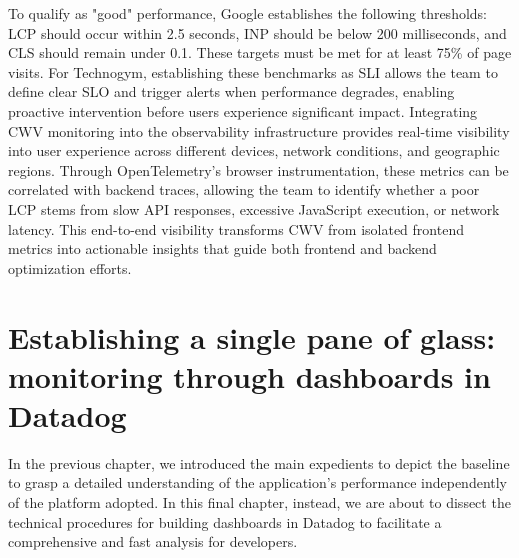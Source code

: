 \documentclass[12pt,a4paper,openright,twoside]{book}
\begin{document}
To qualify as "good" performance, Google establishes the following thresholds: LCP should occur within 2.5 seconds, INP should be below 200 milliseconds, and CLS should remain under 0.1. These targets must be met for at least 75\% of page visits. For Technogym, establishing these benchmarks as \ac{SLI} allows the team to define clear \ac{SLO} and trigger alerts when performance degrades, enabling proactive intervention before users experience significant impact. Integrating CWV monitoring into the observability infrastructure provides real-time visibility into user experience across different devices, network conditions, and geographic regions. Through OpenTelemetry's browser instrumentation, these metrics can be correlated with backend traces, allowing the team to identify whether a poor LCP stems from slow API responses, excessive JavaScript execution, or network latency. This end-to-end visibility transforms CWV from isolated frontend metrics into actionable insights that guide both frontend and backend optimization efforts.

\chapter{Establishing a single pane of glass: monitoring through dashboards in Datadog}

In the previous chapter, we introduced the main expedients to depict the baseline to grasp a detailed understanding of the application's performance independently of the platform adopted. In this final chapter, instead, we are about to dissect the technical procedures for building dashboards in Datadog to facilitate a comprehensive and fast analysis for developers.  
\end{document}
